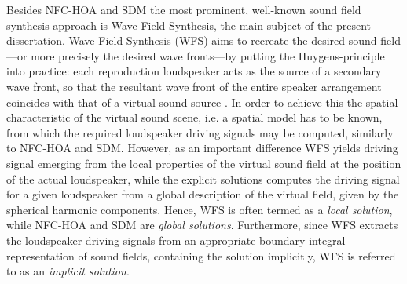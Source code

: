 Besides NFC-HOA and SDM the most prominent, well-known sound field synthesis approach is Wave Field Synthesis, the main subject of the present dissertation.
Wave Field Synthesis (WFS) aims to recreate the desired sound field---or more precisely the desired wave fronts---by putting the Huygens-principle into practice: each reproduction loudspeaker acts as the source of a secondary wave front, so that the resultant wave front of the entire speaker arrangement coincides with that of a virtual sound source \cite{Berkhout1993:Acoustic_control_by_WFS, Verheijen1997:phd, Ahrens2012}.
In order to achieve this the spatial characteristic of the virtual sound scene, i.e. a spatial model has to be known, from which the required loudspeaker driving signals may be computed, similarly to NFC-HOA and SDM.
However, as an important difference WFS yields driving signal emerging from the local properties of the virtual sound field at the position of the actual loudspeaker, while the explicit solutions computes the driving signal for a given loudspeaker from a global description of the virtual field, given by the spherical harmonic components.
Hence, WFS is often termed as a \emph{local solution}, while NFC-HOA and SDM are \emph{global solutions}.
Furthermore, since WFS extracts the loudspeaker driving signals from an appropriate boundary integral representation of sound fields, containing the solution implicitly, WFS is referred to as an \emph{implicit solution}.

